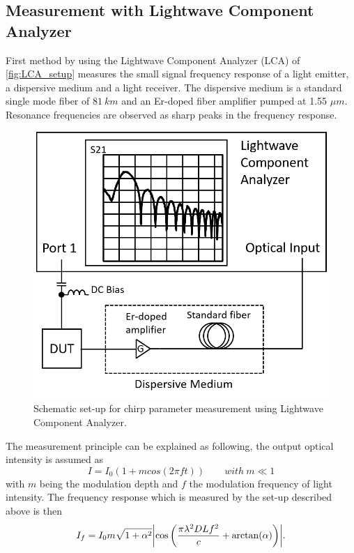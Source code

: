 
\subsection{Measurement with Lightwave Component Analyzer}\label{subsec:measurement_with_LCA}
First method by using the Lightwave Component Analyzer (LCA) of \autoref{fig:LCA_setup} measures the small signal frequency response of a light emitter, a dispersive medium and a light receiver. The dispersive medium is a standard single mode fiber of $81 \ km$ and an Er-doped fiber amplifier pumped at 1.55 $\mu m$. Resonance frequencies are observed as sharp peaks in the frequency response.
\begin{figure}[ht]
    \centering
    \includegraphics[width=.6\linewidth]{figures/LCA_setup.png}
    \caption{Schematic set-up for chirp parameter measurement using Lightwave Component Analyzer.}
    \label{fig:LCA_setup}
\end{figure}

The measurement principle can be explained as following, the output optical intensity is assumed as \cite{devaux1993simple}
\begin{equation}
    I=I_0(1+mcos(2\pi ft)) \qquad with \ m \ll 1
    \label{eq:chirp_optical_intensity}
\end{equation}
with $m$ being the modulation depth and $f$ the modulation frequency of light intensity. The frequency response which is measured by the set-up described above is then \cite{devaux1993simple}
\begin{equation}
    I_f=I_0m\sqrt{1+\alpha^2}\abs{\cos\qty(\frac{\pi\lambda^2DLf^2}{c}+\arctan(\alpha))}.
    \label{eq:chirp_optical_frequency}
\end{equation}

